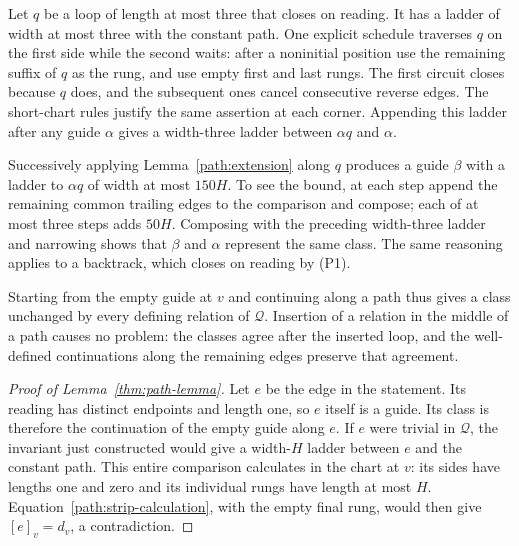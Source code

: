 Let $q$ be a loop of length at most three that closes on reading.
It has a ladder of width at most three with the constant path.  One
explicit schedule traverses $q$ on the first side while the second
waits: after a noninitial position use the remaining suffix of $q$ as
the rung, and use empty first and last rungs.  The first circuit closes
because $q$ does, and the subsequent ones cancel consecutive reverse
edges.  The short-chart rules justify the same assertion at each corner.
Appending this ladder after any guide $\alpha$ gives a width-three
ladder between $\alpha q$ and $\alpha$.

Successively applying Lemma~\ref{path:extension} along $q$ produces a
guide $\beta$ with a ladder to $\alpha q$ of width at most $150H$.
To see the bound, at each step append the remaining common trailing
edges to the comparison and compose; each of at most three steps adds
$50H$.  Composing with the preceding width-three ladder and narrowing
shows that $\beta$ and $\alpha$ represent the same class.  The same
reasoning applies to a backtrack, which closes on reading by (P1).

Starting from the empty guide at $v$ and continuing along a path thus
gives a class unchanged by every defining relation of $\mathcal Q$.
Insertion of a relation in the middle of a path causes no problem:
the classes agree after the inserted loop, and the well-defined
continuations along the remaining edges preserve that agreement.

\begin{proof}[Proof of Lemma~\ref{thm:path-lemma}]
Let $e$ be the edge in the statement.  Its reading has distinct
endpoints and length one, so $e$ itself is a guide.  Its class is
therefore the continuation of the empty guide along $e$.  If $e$ were
trivial in $\mathcal Q$, the invariant just constructed would give a
width-$H$ ladder between $e$ and the constant path.  This entire
comparison calculates in the chart at $v$: its sides have lengths one
and zero and its individual rungs have length at most $H$.
Equation~\eqref{path:strip-calculation}, with the empty final rung,
would then give $[e]_v=d_v$, a contradiction.
\end{proof}
